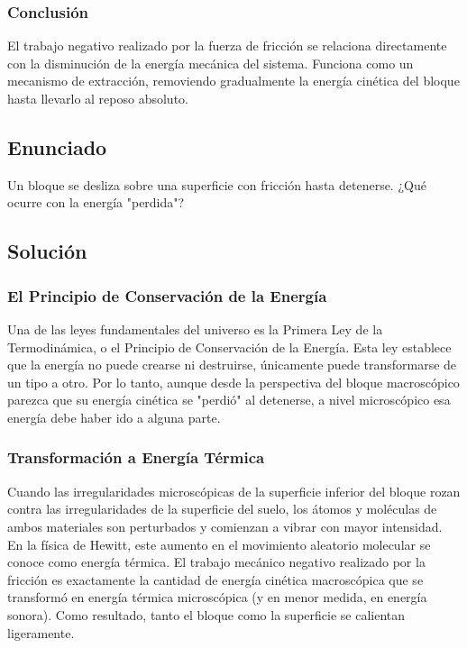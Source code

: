 \documentclass[a4paper,12pt]{article}
\begin{document}
\subsubsection*{Conclusión}
El trabajo negativo realizado por la fuerza de fricción se relaciona directamente con la disminución de la energía mecánica del sistema. Funciona como un mecanismo de extracción, removiendo gradualmente la energía cinética del bloque hasta llevarlo al reposo absoluto.

\newpage
\subsection*{Enunciado}
Un bloque se desliza sobre una superficie con fricción hasta detenerse.
¿Qué ocurre con la energía "perdida"?

\subsection*{Solución}

\subsubsection*{El Principio de Conservación de la Energía}
Una de las leyes fundamentales del universo es la Primera Ley de la Termodinámica, o el Principio de Conservación de la Energía. Esta ley establece que la energía no puede crearse ni destruirse, únicamente puede transformarse de un tipo a otro. Por lo tanto, aunque desde la perspectiva del bloque macroscópico parezca que su energía cinética se "perdió" al detenerse, a nivel microscópico esa energía debe haber ido a alguna parte.

\subsubsection*{Transformación a Energía Térmica}
Cuando las irregularidades microscópicas de la superficie inferior del bloque rozan contra las irregularidades de la superficie del suelo, los átomos y moléculas de ambos materiales son perturbados y comienzan a vibrar con mayor intensidad. En la física de Hewitt, este aumento en el movimiento aleatorio molecular se conoce como energía térmica. 
El trabajo mecánico negativo realizado por la fricción es exactamente la cantidad de energía cinética macroscópica que se transformó en energía térmica microscópica (y en menor medida, en energía sonora). Como resultado, tanto el bloque como la superficie se calientan ligeramente.
\end{document}
